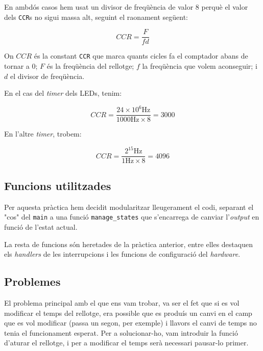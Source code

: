 \documentclass{../pdae} %
\begin{document}
En ambdós casos hem usat un divisor de freqüència de valor 8 perquè el valor
dels \texttt{CCR}s no sigui massa alt, seguint el raonament següent:

\begin{equation*}
  CCR = \frac{F}{fd}
\end{equation*}

On $CCR$ és la constant \texttt{CCR} que marca quants cicles fa el comptador
abans de tornar a 0; $F$ és la freqüència del rellotge; $f$ la freqüència que
volem aconseguir; i $d$ el divisor de freqüència.

En el cas del \textit{timer} dels LEDs, tenim:

\begin{equation*}
  CCR = \frac{24\times10^{6}\mathrm{Hz}}{1000\mathrm{Hz}\times 8} = 3000
\end{equation*}

En l'altre \textit{timer}, trobem:

\begin{equation*}
  CCR = \frac{2^{15}\mathrm{Hz}}{1\mathrm{Hz}\times 8} = 4096
\end{equation*}


\subsection{Funcions utilitzades}

Per aquesta pràctica hem decidit modularitzar lleugerament el codi, separant
el "cos" del \texttt{main} a una funció \texttt{manage\_states} que s'encarrega
de canviar l'\textit{output} en funció de l'estat actual.

La resta de funcions són heretades de la pràctica anterior, entre elles
destaquen els \textit{handlers} de les interrupcions i les funcions de
configuració del \textit{hardware}.

\subsection{Problemes}
El problema principal amb el que ens vam trobar, va ser el fet que si es vol
modificar el temps del rellotge, era possible que es produís un canvi en el
camp que es vol modificar (passa un segon, per exemple) i llavors el canvi de
temps no tenia el funcionament esperat. Per a solucionar-ho, vam introduir la
funció d'aturar el rellotge, i per a modificar el temps serà necessari
pausar-lo primer.
\end{document}
